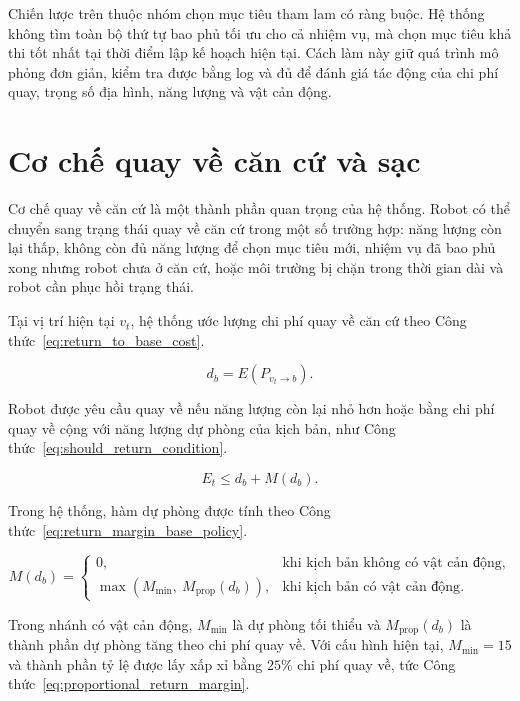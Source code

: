 \documentclass[../DoAn.tex]{subfiles}
\begin{document}
Chiến lược trên thuộc nhóm chọn mục tiêu tham lam có ràng buộc. Hệ thống không tìm toàn bộ thứ tự bao phủ tối ưu cho cả nhiệm vụ, mà chọn mục tiêu khả thi tốt nhất tại thời điểm lập kế hoạch hiện tại. Cách làm này giữ quá trình mô phỏng đơn giản, kiểm tra được bằng log và đủ để đánh giá tác động của chi phí quay, trọng số địa hình, năng lượng và vật cản động.

\section{Cơ chế quay về căn cứ và sạc}

Cơ chế quay về căn cứ là một thành phần quan trọng của hệ thống. Robot có thể chuyển sang trạng thái quay về căn cứ trong một số trường hợp: năng lượng còn lại thấp, không còn đủ năng lượng để chọn mục tiêu mới, nhiệm vụ đã bao phủ xong nhưng robot chưa ở căn cứ, hoặc môi trường bị chặn trong thời gian dài và robot cần phục hồi trạng thái.

Tại vị trí hiện tại $v_t$, hệ thống ước lượng chi phí quay về căn cứ theo Công thức~\ref{eq:return_to_base_cost}.

\begin{equation}
    d_b = E(P_{v_t\rightarrow b}).
    \label{eq:return_to_base_cost}
\end{equation}

Robot được yêu cầu quay về nếu năng lượng còn lại nhỏ hơn hoặc bằng chi phí quay về cộng với năng lượng dự phòng của kịch bản, như Công thức~\ref{eq:should_return_condition}.

\begin{equation}
    E_t \le d_b + M(d_b).
    \label{eq:should_return_condition}
\end{equation}

Trong hệ thống, hàm dự phòng được tính theo Công thức~\ref{eq:return_margin_base_policy}.

\begin{equation}
M(d_b)=
\begin{cases}
0, & \text{khi kịch bản không có vật cản động},\\
\max\left(M_{\min},\ M_{\text{prop}}(d_b)\right), & \text{khi kịch bản có vật cản động}.
\end{cases}
\label{eq:return_margin_base_policy}
\end{equation}

Trong nhánh có vật cản động, $M_{\min}$ là dự phòng tối thiểu và $M_{\text{prop}}(d_b)$ là thành phần dự phòng tăng theo chi phí quay về. Với cấu hình hiện tại, $M_{\min}=15$ và thành phần tỷ lệ được lấy xấp xỉ bằng $25\%$ chi phí quay về, tức Công thức~\ref{eq:proportional_return_margin}.
\end{document}
